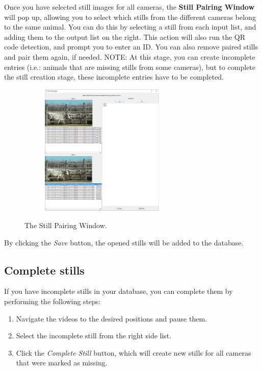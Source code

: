 \documentclass[10pt,a4paper,oneside]{report}             %
\newcommand*{\img}[1]{%
	\raisebox{-.02\baselineskip}{%
		\texttt{[image: \#1]}%
	}%
}
\begin{document}
Once you have selected still images for all cameras, the \textbf{Still Pairing Window} will pop up, allowing you to select which stills from the different cameras belong to the same animal. You can do this by selecting a still from each input list, and adding them to the output list on the right. This action will also run the QR code detection, and prompt you to enter an ID. You can also remove paired stills and pair them again, if needed. NOTE: At this stage, you can create incomplete entries (i.e.: animals that are missing stills from some cameras), but to complete the still creation stage, these incomplete entries have to be completed. 

\begin{figure}[H]
	\centering
	\begin{subfigure}{\textwidth}
		\centering 
		\includegraphics[width=0.65\textwidth]{./images/PairStill.png}
	\end{subfigure}
	\caption[]
	{\small  The Still Pairing Window.}
\end{figure} 

By clicking the \textit{Save} \img{../VAM/Icons/1462036176_save_accept.png} button, the opened stills will be added to the database.

\subsection{Complete stills} \label{sec:compStill}

If you have incomplete stills in your database, you can complete them by performing the following steps:
\begin{enumerate}
	\item Navigate the videos to the desired positions  and pause them.
	\item Select the incomplete still from the right side list.
	\item Click the \textit{Complete Still} \img{../VAM/Icons/1462024271_New_image.png} button, which will create new stills for all cameras that were marked as missing.
\end{enumerate}
\end{document}
